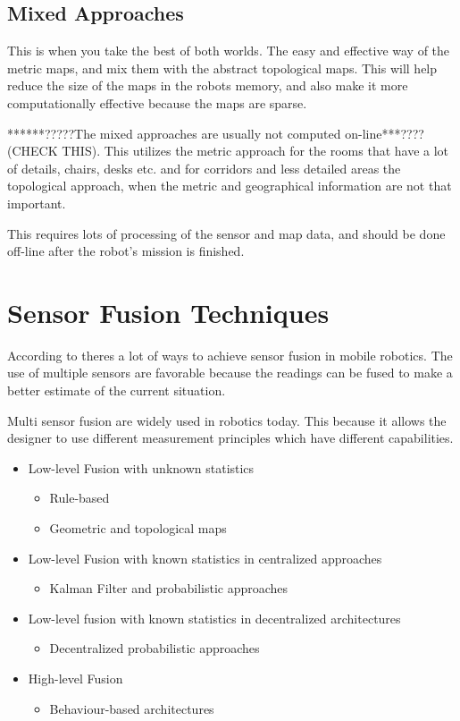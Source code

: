 \subsection{Mixed Approaches}
This is when you take the best of both worlds. The easy and effective way of the metric
maps, and mix them with the abstract topological maps. This will help reduce the size of
the maps in the robots memory, and also make it more computationally effective because the
maps are sparse. 

******?????The mixed approaches are usually not computed on-line***???? (CHECK THIS). This utilizes
the metric approach for the rooms that have a lot of details, chairs, desks etc. and for
corridors and less detailed areas the topological approach, when the metric and
geographical information are not that important. 

This requires lots of processing of the sensor and map data, and should be done off-line
after the robot's mission is finished. 


\section{Sensor Fusion Techniques}
According to \cite{sensor-fusion-mobile-robots} theres a lot of ways to achieve sensor
fusion in mobile robotics. The use of multiple sensors are favorable because the readings
can be fused to make a better estimate of the current situation. 

Multi sensor fusion are widely used in robotics today. This because it allows the designer
to use different measurement principles which have different capabilities. 


\begin{itemize}
    \item Low-level Fusion with unknown statistics
        \begin{itemize}
            \item Rule-based
            \item Geometric and topological maps
        \end{itemize}
    \item Low-level Fusion with known statistics in centralized approaches
        \begin{itemize}
            \item Kalman Filter and probabilistic approaches
        \end{itemize}
    \item Low-level fusion with known statistics in decentralized architectures
        \begin{itemize}
            \item Decentralized probabilistic approaches
        \end{itemize}
    \item High-level Fusion
        \begin{itemize}
            \item Behaviour-based architectures
        \end{itemize}
\end{itemize}


